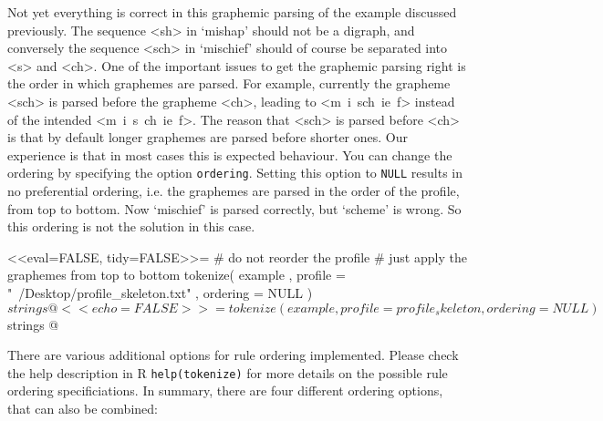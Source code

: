 Not yet everything is correct in this graphemic parsing of the example discussed
previously. The sequence <sh> in `mishap' should not be a digraph, and
conversely the sequence <sch> in `mischief' should of course be separated into
<s> and <ch>. One of the important issues to get the graphemic parsing right is
the order in which graphemes are parsed. For example, currently the grapheme
<sch> is parsed before the grapheme <ch>, leading to <m\ i\ sch\ ie\ f> instead
of the intended <m\ i\ s\ ch\ ie\ f>. The reason that <sch> is parsed before
<ch> is that by default longer graphemes are parsed before shorter ones. Our
experience is that in most cases this is expected behaviour. You can change the
ordering by specifying the option \texttt{ordering}. Setting this option to
\texttt{NULL} results in no preferential ordering, i.e. the graphemes are parsed
in the order of the profile, from top to bottom. Now `mischief' is parsed
correctly, but `scheme' is wrong. So this ordering is not the solution in this
case.

<<eval=FALSE, tidy=FALSE>>= 
# do not reorder the profile
# just apply the graphemes from top to bottom
tokenize( example
         , profile = "~/Desktop/profile_skeleton.txt"
         , ordering = NULL
        )$strings
@

<<echo=FALSE>>=
tokenize( example, profile = profile_skeleton, ordering = NULL)$strings
@

There are various additional options for rule ordering implemented. Please check
the help description in R \texttt{help(tokenize)} for more details on the
possible rule ordering specificiations. In summary, there are four different 
ordering options, that can also be combined:

